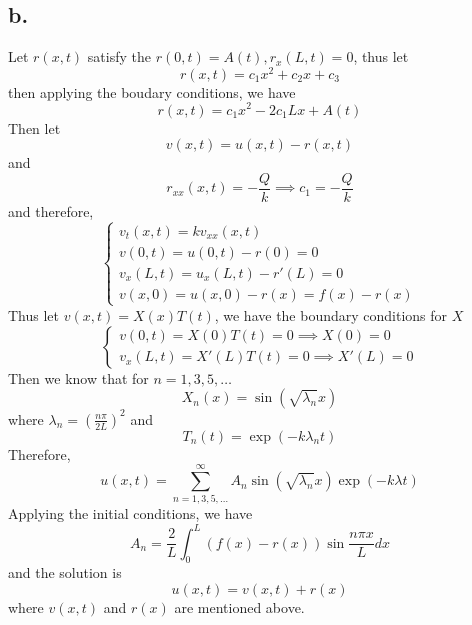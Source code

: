 \documentclass[11pt]{article}
\theoremstyle{mystyle}
\theoremstyle{definition}
\begin{document}
\subsection*{b.}
Let $r(x,t)$ satisfy the $r(0,t) = A(t), r_x(L,t) = 0$, thus let
\[
  r(x,t) = c_1 x^2 + c_2x + c_3
\]
then applying the boudary conditions, we have 
\[
  r(x,t) = c_1 x^2 - 2c_1 Lx + A(t)
\]
Then let 
\[
  v(x,t) = u(x,t) - r(x,t)
\]
and 
\[
  r_{xx}(x,t) = - \displaystyle\frac{Q}{k} \implies c_1 = -\displaystyle\frac{Q}{k}
\]
and therefore, 
\[
  \begin{cases}
    v_t(x,t) = kv_{xx}(x,t) \\
    v(0,t) = u(0,t) - r(0) = 0 \\
    v_x(L,t) = u_x(L,t) - r'(L) = 0 \\
    v(x,0) = u(x,0) - r(x) = f(x) - r(x)
  \end{cases}
\]
Thus let $v(x,t) = X(x) T(t)$, we have the boundary conditions for $X$
\[
  \begin{cases}
    v(0,t) = X(0) T(t) =0 \implies X(0) = 0 \\
    v_x(L,t) = X'(L) T(t) = 0 \implies X'(L) = 0 
  \end{cases}
\]
Then we know that for $n=1,3,5, \hdots$
\[
  X_n(x) = \sin(\sqrt{\lambda_n}x)
\]
where $\lambda_n = \left( \displaystyle\frac{n\pi}{2L}\right)^2$ and 
\[
  T_n(t) = \exp(-k \lambda_n t)
\]
Therefore, 
\[
  u(x,t) = \sum_{n=1,3,5, \hdots}^\infty A_n \sin(\sqrt{\lambda_n}x) \exp(-k \lambda t)
\]
Applying the initial conditions, we have 
\[
  A_n = \displaystyle\frac{2}{L} \int_0^L (f(x)-r(x)) \sin \displaystyle\frac{n\pi x}{L} dx
\]
and the solution is 
\[
  u(x,t) = v(x,t) + r(x)
\]
where $v(x,t)$ and $r(x)$ are mentioned above.
\newpage
\end{document}
